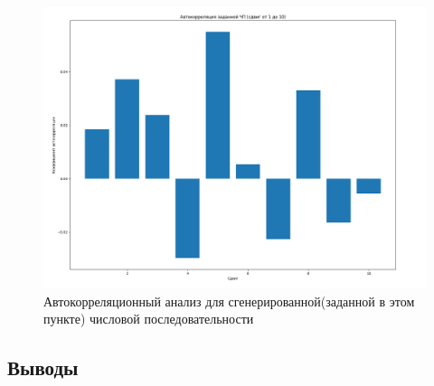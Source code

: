 \begin{figure}[H]
	\centering
	\includegraphics[width=1\textwidth]{../data/auto_corellation_random-2.png}
	\caption{Автокорреляционный анализ для сгенерированной(заданной в этом пункте) числовой последовательности}
\end{figure}

\subsection{Выводы}

